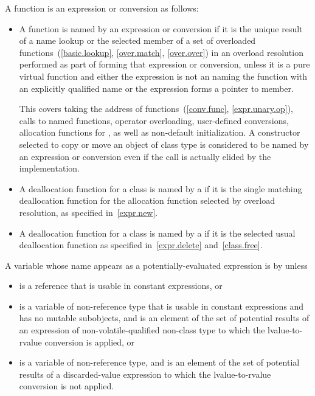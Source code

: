 \pnum
A function is 
an expression or conversion as follows:
\begin{itemize}
\item
  A function is named by an expression or conversion
  if it is the unique result of a name lookup or the selected member
  of a set of overloaded functions~(\ref{basic.lookup}, \ref{over.match}, \ref{over.over})
  in an overload resolution performed
  as part of forming that expression or conversion,
  unless it is a pure virtual function and either
  the expression is not an  naming the function with
  an explicitly qualified name or
  the expression forms a pointer to member.
  \begin{note} This covers
  taking the address of functions~(\ref{conv.func}, \ref{expr.unary.op}),
  calls to named functions,
  operator overloading,
  user-defined conversions,
  allocation functions for , as well as
  non-default initialization.
  A constructor selected to copy or move an object of class type
  is considered to be named by an expression or conversion
  even if the call is actually elided by the implementation. \end{note}
\item
  A deallocation function for a class
  is named by a 
  if it is the single matching deallocation function
  for the allocation function selected by overload resolution,
  as specified in~\ref{expr.new}.
\item
  A deallocation function for a class
  is named by a 
  if it is the selected usual deallocation function
  as specified in~\ref{expr.delete} and~\ref{class.free}.
\end{itemize}

\pnum
A variable  whose name appears as a
potentially-evaluated expression 
is  by  unless
\begin{itemize}
\item
   is a reference that is
  usable in constant expressions, or
\item
   is a variable of non-reference type that is
  usable in constant expressions and has no mutable subobjects, and
   is an element of the set of potential results of an expression
  of non-volatile-qualified non-class type
  to which the lvalue-to-rvalue conversion is applied, or
\item
   is a variable of non-reference type, and
   is an element of the set of potential results
  of a discarded-value expression
  to which the lvalue-to-rvalue conversion is not applied.
\end{itemize}

